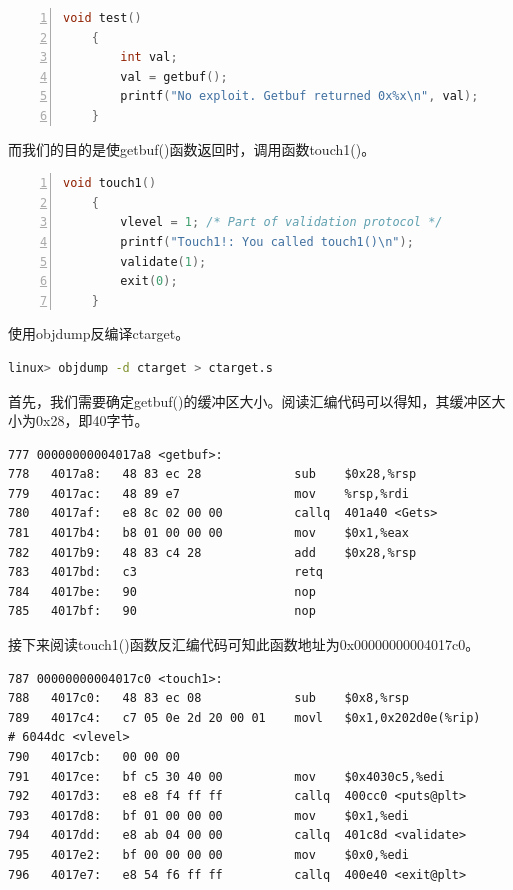 \documentclass{article}
\begin{document}
\begin{lstlisting}[title = 函数test()的C代码, xleftmargin = 4em,xrightmargin = 4em, aboveskip = 1em, numbers = left, language = C]
    void test() 
    {
        int val;
        val = getbuf();
        printf("No exploit. Getbuf returned 0x%x\n", val);
    }
\end{lstlisting}
而我们的目的是使getbuf()函数返回时，调用函数touch1()。
\begin{lstlisting}[title = 函数touch1()的C代码, xleftmargin = 4em,xrightmargin = 4em, aboveskip = 1em, numbers = left, language = C]
    void touch1()
    {
        vlevel = 1; /* Part of validation protocol */
        printf("Touch1!: You called touch1()\n");
        validate(1);
        exit(0);
    }
\end{lstlisting}

使用objdump反编译ctarget。
\begin{lstlisting}[language=bash]
    linux> objdump -d ctarget > ctarget.s
  \end{lstlisting}

首先，我们需要确定getbuf()的缓冲区大小。阅读汇编代码可以得知，其缓冲区大小为0x28，即40字节。

\begin{lstlisting}[title = getbuf()函数反汇编代码, xleftmargin = 4em,xrightmargin = 4em, aboveskip = 1em, numbers = none]
777 00000000004017a8 <getbuf>:                                                 
778   4017a8:   48 83 ec 28             sub    $0x28,%rsp
779   4017ac:   48 89 e7                mov    %rsp,%rdi
780   4017af:   e8 8c 02 00 00          callq  401a40 <Gets>
781   4017b4:   b8 01 00 00 00          mov    $0x1,%eax
782   4017b9:   48 83 c4 28             add    $0x28,%rsp
783   4017bd:   c3                      retq
784   4017be:   90                      nop
785   4017bf:   90                      nop    
\end{lstlisting}

接下来阅读touch1()函数反汇编代码可知此函数地址为0x00000000004017c0。

\begin{lstlisting}[title = touch1()函数反汇编代码, xleftmargin = 4em,xrightmargin = 4em, aboveskip = 1em, numbers = none]
787 00000000004017c0 <touch1>:
788   4017c0:   48 83 ec 08             sub    $0x8,%rsp
789   4017c4:   c7 05 0e 2d 20 00 01    movl   $0x1,0x202d0e(%rip)        # 6044dc <vlevel>
790   4017cb:   00 00 00
791   4017ce:   bf c5 30 40 00          mov    $0x4030c5,%edi
792   4017d3:   e8 e8 f4 ff ff          callq  400cc0 <puts@plt>
793   4017d8:   bf 01 00 00 00          mov    $0x1,%edi
794   4017dd:   e8 ab 04 00 00          callq  401c8d <validate>
795   4017e2:   bf 00 00 00 00          mov    $0x0,%edi
796   4017e7:   e8 54 f6 ff ff          callq  400e40 <exit@plt>  
\end{lstlisting}
\end{document}
